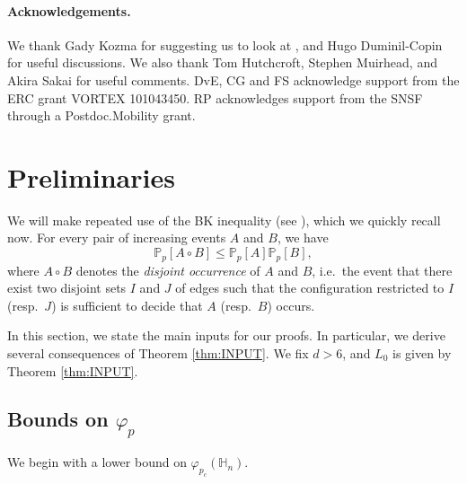 \documentclass[11pt,a4paper]{article}
\numberwithin{equation}{section}
\theoremstyle{plain}
\theoremstyle{definition}
\newcommand{\1}{\mathbf 1}
\def\P{\mathbb{P}} %
\def\bf{\bfseries}
\begin{document}
\paragraph{Acknowledgements.} We thank Gady Kozma for suggesting us to look at \cite{DewanMuirhead}, and Hugo Duminil-Copin for useful discussions. We also thank Tom Hutchcroft, Stephen Muirhead, and Akira Sakai for useful comments. DvE, CG and FS acknowledge support from the ERC grant VORTEX 101043450. RP acknowledges support from the SNSF through a Postdoc.Mobility grant. 



	
\section{Preliminaries}\label{sec:preliminaries}
	
We will make repeated use of the BK inequality (see \cite[Section 2.3]{GrimmettPercolation1999}), which we quickly recall now. For every pair of increasing events $A$ and $B$, we have
\begin{equation}\tag{BK}\label{eq:BK}
	\P_p[A\circ B]\leq \P_p[A]\P_p[B],
\end{equation}
where $A\circ B$ denotes the \emph{disjoint occurrence} of $A$ and $B$, i.e.~the event that there exist two disjoint sets $I$ and $J$ of edges such that the configuration restricted to $I$ (resp.~$J$) is sufficient to decide that $A$ (resp.~$B$) occurs.

In this section, we state the main inputs for our proofs. In particular, we derive several consequences of Theorem \ref{thm:INPUT}. We fix $d>6$, and $L_0$ is given by Theorem \ref{thm:INPUT}.
	
\subsection{Bounds on $\varphi_p$}\label{subsec:correlation_lenght}

We begin with a lower bound on $\varphi_{p_c}(\mathbb H_n)$.
\end{document}
